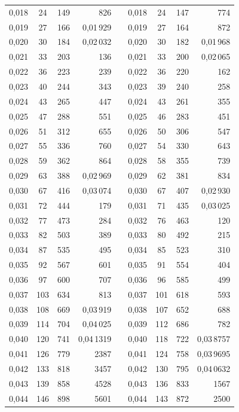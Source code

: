 \begin{tabular}{|c|c|c|r|@{}p{9pt}@{}|c|c|c|r|}
0,018 & 24 & 149 & 826 &  & 0,018 & 24 & 147 & 774 \\
0,019 & 27 & 166 & 0,01\,929 &  & 0,019 & 27 & 164 & 872 \\
0,020 & 30 & 184 & 0,02\,032 &  & 0,020 & 30 & 182 & 0,01\,968 \\[3pt]
0,021 & 33 & 203 & 136 &  & 0,021 & 33 & 200 & 0,02\,065 \\
0,022 & 36 & 223 & 239 &  & 0,022 & 36 & 220 & 162 \\
0,023 & 40 & 244 & 343 &  & 0,023 & 39 & 240 & 258 \\
0,024 & 43 & 265 & 447 &  & 0,024 & 43 & 261 & 355 \\
0,025 & 47 & 288 & 551 &  & 0,025 & 46 & 283 & 451 \\[3pt]
0,026 & 51 & 312 & 655 &  & 0,026 & 50 & 306 & 547 \\
0,027 & 55 & 336 & 760 &  & 0,027 & 54 & 330 & 643 \\
0,028 & 59 & 362 & 864 &  & 0,028 & 58 & 355 & 739 \\
0,029 & 63 & 388 & 0,02\,969 &  & 0,029 & 62 & 381 & 834 \\
0,030 & 67 & 416 & 0,03\,074 &  & 0,030 & 67 & 407 & 0,02\,930 \\[3pt]
0,031 & 72 & 444 & 179 &  & 0,031 & 71 & 435 & 0,03\,025 \\
0,032 & 77 & 473 & 284 &  & 0,032 & 76 & 463 & 120 \\
0,033 & 82 & 503 & 389 &  & 0,033 & 80 & 492 & 215 \\
0,034 & 87 & 535 & 495 &  & 0,034 & 85 & 523 & 310 \\
0,035 & 92 & 567 & 601 &  & 0,035 & 91 & 554 & 404 \\[3pt]
0,036 & 97 & 600 & 707 &  & 0,036 & 96 & 585 & 499 \\
0,037 & 103 & 634 & 813 &  & 0,037 & 101 & 618 & 593 \\
0,038 & 108 & 669 & 0,03\,919 &  & 0,038 & 107 & 652 & 688 \\
0,039 & 114 & 704 & 0,04\,025 &  & 0,039 & 112 & 686 & 782 \\
0,040 & 120 & 741 & 0,04\,1319 &  & 0,040 & 118 & 722 & 0,03\,8757 \\[3pt]
0,041 & 126 & 779 & 2387 &  & 0,041 & 124 & 758 & 0,03\,9695 \\
0,042 & 133 & 818 & 3457 &  & 0,042 & 130 & 795 & 0,04\,0632 \\
0,043 & 139 & 858 & 4528 &  & 0,043 & 136 & 833 & 1567 \\
0,044 & 146 & 898 & 5601 &  & 0,044 & 143 & 872 & 2500 \\

\end{tabular}
